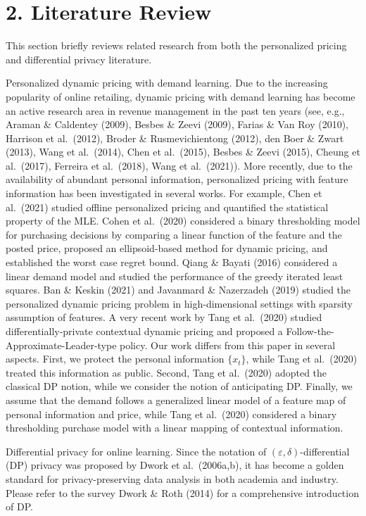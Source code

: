 \section{2. Literature Review}\label{literature-review}

This section briefly reviews related research from both the personalized pricing and differential privacy literature.

Personalized dynamic pricing with demand learning. Due to the increasing popularity of online retailing, dynamic pricing with demand learning has become an active research area in revenue management in the past ten years (see, e.g., Araman \& Caldentey (2009), Besbes \& Zeevi (2009), Farias \& Van Roy (2010), Harrison et al.~(2012), Broder \& Rusmevichientong (2012), den Boer \& Zwart (2013), Wang et al.~(2014), Chen et al.~(2015), Besbes \& Zeevi (2015), Cheung et al.~(2017), Ferreira et al.~(2018), Wang et al.~(2021)). More recently, due to the availability of abundant personal information, personalized pricing with feature information has been investigated in several works. For example, Chen et al.~(2021) studied offline personalized pricing and quantified the statistical property of the MLE. Cohen et al.~(2020) considered a binary thresholding model for purchasing decisions by comparing a linear function of the feature and the posted price, proposed an ellipsoid-based method for dynamic pricing, and established the worst case regret bound. Qiang \& Bayati (2016) considered a linear demand model and studied the performance of the greedy iterated least squares. Ban \& Keskin (2021) and Javanmard \& Nazerzadeh (2019) studied the personalized dynamic pricing problem in high-dimensional settings with sparsity assumption of features. A very recent work by Tang et al.~(2020) studied differentially-private contextual dynamic pricing and proposed a Follow-the-Approximate-Leader-type policy. Our work differs from this paper in several aspects. First, we protect the personal information \(\{ x _ { t } \}\), while Tang et al.~(2020) treated this information as public. Second, Tang et al.~(2020) adopted the classical DP notion, while we consider the notion of anticipating DP. Finally, we assume that the demand follows a generalized linear model of a feature map of personal information and price, while Tang et al.~(2020) considered a binary thresholding purchase model with a linear mapping of contextual information.

Differential privacy for online learning. Since the notation of \((\varepsilon , \delta)\)-differential (DP) privacy was proposed by Dwork et al.~(2006a,b), it has become a golden standard for privacy-preserving data analysis in both academia and industry. Please refer to the survey Dwork \& Roth (2014) for a comprehensive introduction of DP.

